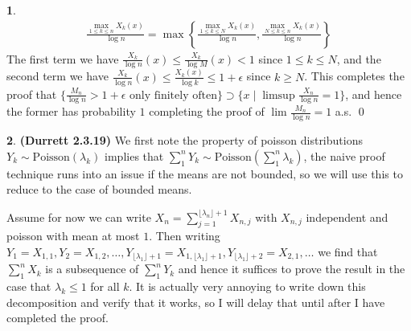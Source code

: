 \documentclass[10.5pt]{article}
\theoremstyle{definition}
\newtheorem{pb}{}
\newcommand{\set}[1]{\{#1\}}
\newcommand{\floor}[1]{\lfloor#1\rfloor}
\begin{document}
\begin{pb}
        \begin{align*}
            \frac{\max_{1 \leq k \leq n}X_k(x)}{\log n} = \max\left\{\frac{\max_{1 \leq k \leq N}X_k(x)}{\log n}, \frac{\max_{N \leq k \leq n}X_k(x)}{\log n}\right\}
        \end{align*}
        The first term we have \(\frac{X_k}{\log n}(x) \leq \frac{X_k}{\log M}(x) < 1\) since \(1 \leq k \leq N\), and the second term we have \(\frac{X_k}{\log n}(x) \leq \frac{X_k(x)}{\log k} \leq 1 + \epsilon\) since \(k \geq N\). This completes the proof that \(\set{\frac{M_n}{\log n} > 1 + \epsilon \text{ only finitely often}} \supset \set{x \mid \limsup \frac{X_n}{\log n} = 1}\), and hence the former has probability \(1\) completing the proof of \(\lim \frac{M_n}{\log n} = 1\) a.s. \qed
    \end{pb}
    \begin{pb} \textbf{(Durrett 2.3.19)}
        We first note the property of poisson distributions \(Y_k \sim \text{Poisson}(\lambda_k)\) implies that \(\sum_1^n Y_k \sim \text{Poisson}(\sum_1^n \lambda_k)\), the naive proof technique runs into an issue if the means are not bounded, so we will use this to reduce to the case of bounded means.

        Assume for now we can write \(X_n = \sum_{j=1}^{\floor{\lambda_n} + 1} X_{n,j}\) with \(X_{n,j}\) independent and poisson with mean at most \(1\). Then writing \(Y_1 = X_{1,1}, Y_2 = X_{1,2}, \hdots, Y_{\floor{\lambda_1} + 1} = X_{1,\floor{\lambda_1} + 1}, Y_{\floor{\lambda_1} + 2} = X_{2,1}, \hdots\) we find that \(\sum_1^n X_k\) is a subsequence of \(\sum_1^n Y_k\) and hence it suffices to prove the result in the case that \(\lambda_k \leq 1\) for all \(k\). It is actually very annoying to write down this decomposition and verify that it works, so I will delay that until after I have completed the proof.


\end{pb}
\end{document}

